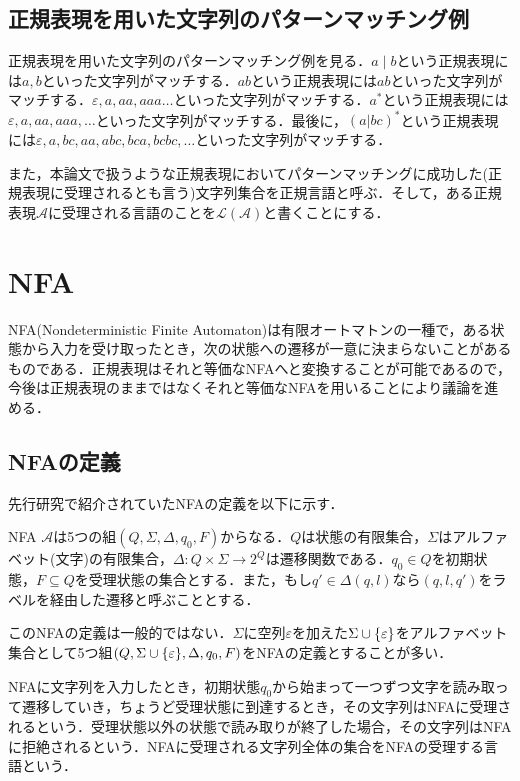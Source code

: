 \documentclass[a4paper, 12pt, dvipdfmx, uplatex]{jsreport}
\begin{document}
\subsection{正規表現を用いた文字列のパターンマッチング例}
正規表現を用いた文字列のパターンマッチング例を見る．$a\mid b$という正規表現には$a,b$といった文字列がマッチする．$ab$という正規表現には$ab$といった文字列がマッチする．$\varepsilon,a,aa,aaa\ldots$といった文字列がマッチする．$a^*$という正規表現には$\varepsilon,a,aa,aaa,\ldots$といった文字列がマッチする．最後に，$(a|bc)^*$という正規表現には$\varepsilon,a,bc,aa,abc,bca,bcbc,\ldots$といった文字列がマッチする．

また，本論文で扱うような正規表現においてパターンマッチングに成功した(正規表現に受理されるとも言う)文字列集合を正規言語と呼ぶ．そして，ある正規表現$\mathcal{A}$に受理される言語のことを$\mathcal{L(A)}$と書くことにする．


\section{NFA}
NFA(Nondeterministic Finite Automaton)は有限オートマトンの一種で，ある状態から入力を受け取ったとき，次の状態への遷移が一意に決まらないことがあるものである．正規表現はそれと等価なNFAへと変換することが可能であるので，今後は正規表現のままではなくそれと等価なNFAを用いることにより議論を進める．

\subsection{NFAの定義}
先行研究で紹介されていたNFAの定義を以下に示す．
\begin{dfn}[NFA]
  NFA $\mathcal{A}$は5つの組$(Q,\Sigma,\Delta,q_0,F)$からなる．$Q$は状態の有限集合，$\Sigma$はアルファベット(文字)の有限集合，$\Delta :Q\times \Sigma \rightarrow 2^Q$は遷移関数である．$q_0 \in Q$を初期状態，$F \subseteq Q$を受理状態の集合とする．また，もし$q'\in \Delta (q,l)$なら$(q,l,q')$をラベルを経由した遷移と呼ぶこととする．
\end{dfn}

このNFAの定義は一般的ではない．$\Sigma$に空列$\varepsilon$を加えた$\Sigma \cup \qty{\varepsilon}$をアルファベット集合として5つ組$(Q,\Sigma \cup \qty{\varepsilon},\Delta,q_0,F)$をNFAの定義とすることが多い．

NFAに文字列を入力したとき，初期状態$q_0$から始まって一つずつ文字を読み取って遷移していき，ちょうど受理状態に到達するとき，その文字列はNFAに受理されるという．受理状態以外の状態で読み取りが終了した場合，その文字列はNFAに拒絶されるという．NFAに受理される文字列全体の集合をNFAの受理する言語という．
\end{document}
